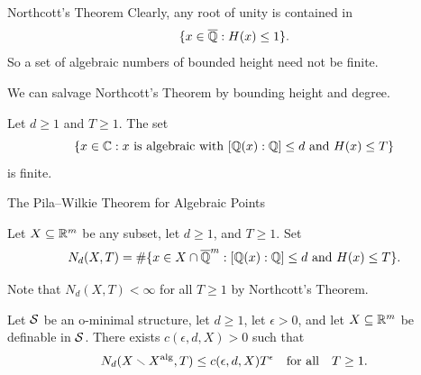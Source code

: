 \documentclass{beamer}
\begin{document}
\begin{frame}{Northcott's Theorem}
  Clearly, any root of unity is contained in
  \begin{equation*}
    \{x\in{\overline{\mathbb{Q}}} : H(x)\le 1\}.
  \end{equation*}
  So a set of algebraic numbers of bounded height need \alert{not} be finite.
  
  We can salvage Northcott's Theorem by 
  bounding \alert{height and  degree}.
  
  \begin{theorem}
    Let $d\ge 1$ and $T\ge 1$. The set
    \begin{equation*}
      \{x\in {\mathbb{C}} : x \text{ is algebraic with }[{\mathbb{Q}}(x):{\mathbb{Q}}]\le d\text{
        and }H(x)\le T\}
    \end{equation*}
    is finite. 
  \end{theorem}
\end{frame}


\begin{frame}{The Pila--Wilkie Theorem for Algebraic Points}
  \begin{definition}
    Let $X\subseteq{\mathbb{R}}^m$ be any subset, let $d\ge 1$, and $T\ge 1$. Set
    \begin{equation*}
      N_d (X,T) = \#\{ x\in X\cap {\overline{\mathbb{Q}}}^m : [{\mathbb{Q}}(x):{\mathbb{Q}}]\le d
      \text{ and }
      H(x)\le T\}.
    \end{equation*}
  \end{definition}

  Note that $N_d(X,T)<\infty$ for all $T\ge 1$ by Northcott's Theorem. 

  \begin{theorem}[Pila]
    Let ${\mathcal S}$ be an o-minimal structure, let $d\ge 1$, let $\epsilon
    >0$, and   let $X\subseteq{\mathbb{R}}^m$ be
    definable in ${\mathcal S}$. 
    There exists  $c(\epsilon,d,X)>0$ such that
    \begin{equation*}
      N_d(X\smallsetminus X^{\mathrm{alg}},T)\le c(\epsilon,d,X) T^\epsilon \quad\text{for
        all}\quad T\ge 1.
    \end{equation*}
  \end{theorem}
\end{frame}
\end{document}
